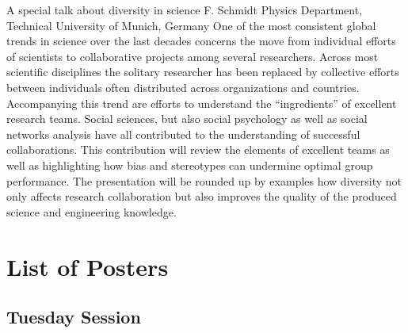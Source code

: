 \documentclass[
openany, %
parskip=full, %
12pt, %
a4paper, %
]{conferencebooklet} %
\begin{document}
	\abstract
	{A special talk about diversity in science} %
	{F. Schmidt} %
	{\ITtag} %
	{Physics Department, Technical University of Munich, Germany} %
	{One of the most consistent global trends in science over the last decades concerns the move from individual efforts of scientists to collaborative projects among several researchers. Across most scientific disciplines the solitary researcher has been replaced by collective efforts between individuals often distributed across organizations and countries. Accompanying this trend are efforts to understand the “ingredients” of excellent research teams. Social sciences, but also social psychology as well as social networks analysis have all contributed to the understanding of successful collaborations. This contribution will review the elements of excellent teams as well as highlighting how bias and stereotypes can undermine optimal group performance. The presentation will be rounded up by examples how diversity not only affects research collaboration but also improves the quality of the produced science and engineering knowledge.} %
	
	
	\chapter{List of Posters} 
	
	\vspace{-2.5em}
	
	\section{Tuesday Session}
	
\end{document}
